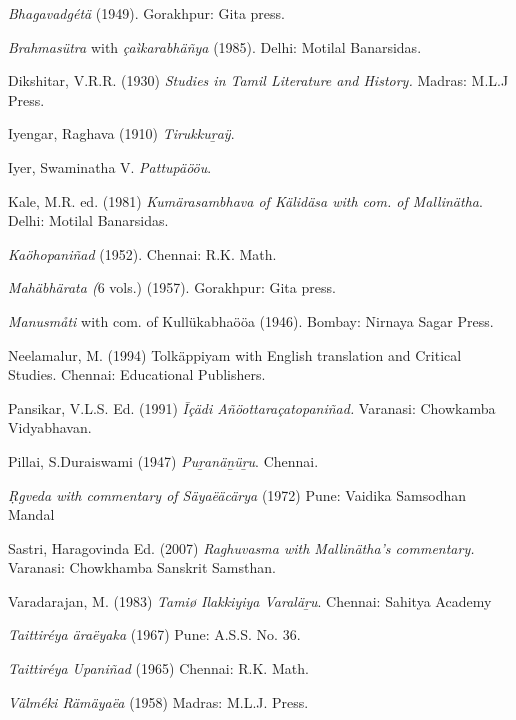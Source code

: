 \begin{thebibliography}{99}
 \textit{Bhagavadgétä} (1949). Gorakhpur: Gita press.

  \textit{Brahmasütra} with \textit{çaìkarabhäñya} (1985). Delhi: Motilal Banarsidas.

  Dikshitar, V.R.R. (1930) \textit{Studies in Tamil Literature and History.} Madras: M.L.J Press.

  Iyengar, Raghava (1910) \textit{Tirukkuṟaÿ}.

  Iyer, Swaminatha V. \textit{Pattupäööu}.

  Kale, M.R. ed. (1981) \textit{Kumärasambhava of Kälidäsa with com. of Mallinätha}. Delhi: Motilal Banarsidas.

  \textit{Kaöhopaniñad} (1952). Chennai: R.K. Math.

  \textit{Mahäbhärata (}6 vols.) (1957). Gorakhpur: Gita press.

  \textit{Manusmåti} with com. of Kullükabhaööa (1946). Bombay: Nirnaya Sagar Press.

  Neelamalur, M. (1994) Tolkäppiyam with English translation and Critical Studies. Chennai: Educational Publishers.

  Pansikar, V.L.S. Ed. (1991) \textit{Īçädi Añöottaraçatopaniñad.} Varanasi: Chowkamba Vidyabhavan.

  Pillai, S.Duraiswami (1947) \textit{Puṟanäṉüṟu}. Chennai.

  \textit{Ṛgveda with commentary of Säyaëäcärya} (1972) Pune: Vaidika Samsodhan Mandal

  Sastri, Haragovinda Ed. (2007) \textit{Raghuvasma with Mallinätha’s commentary.} Varanasi: Chowkhamba Sanskrit Samsthan.

  Varadarajan, M. (1983) \textit{Tamiø Ilakkiyiya Varaläṟu}. Chennai: Sahitya Academy

  \textit{Taittiréya äraëyaka} (1967) Pune: A.S.S. No. 36.

  \textit{Taittiréya Upaniñad} (1965) Chennai: R.K. Math.

  \textit{Välméki Rämäyaëa} (1958) Madras: M.L.J. Press.

 \end{thebibliography}

